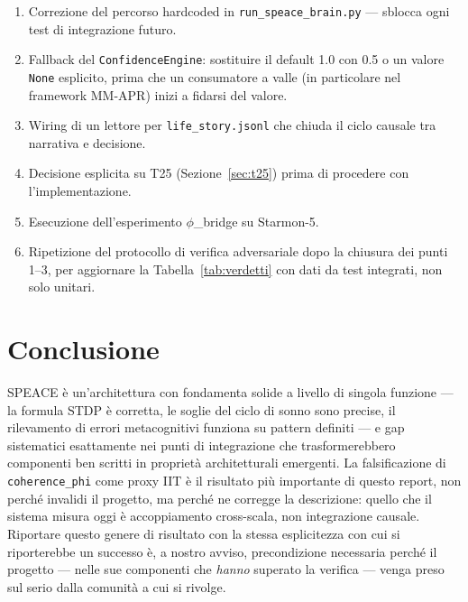 \documentclass[11pt,a4paper]{article}
\newcommand{\code}[1]{\texttt{#1}}
\newcommand{\coherencephi}{\code{coherence\_phi}}
\newcommand{\starmon}{Starmon-5\xspace}
\begin{document}
\begin{enumerate}
  \item Correzione del percorso hardcoded in \code{run\_speace\_brain.py} --- sblocca ogni test di integrazione futuro.
  \item Fallback del \code{ConfidenceEngine}: sostituire il default 1.0 con 0.5 o un valore \code{None} esplicito, prima che un consumatore a valle (in particolare nel framework MM-APR) inizi a fidarsi del valore.
  \item Wiring di un lettore per \code{life\_story.jsonl} che chiuda il ciclo causale tra narrativa e decisione.
  \item Decisione esplicita su T25 (Sezione~\ref{sec:t25}) prima di procedere con l'implementazione.
  \item Esecuzione dell'esperimento $\phi$\_bridge su \starmon.
  \item Ripetizione del protocollo di verifica adversariale dopo la chiusura dei punti 1--3, per aggiornare la Tabella~\ref{tab:verdetti} con dati da test integrati, non solo unitari.
\end{enumerate}

\section{Conclusione}
\label{sec:conclusion}

SPEACE \`e un'architettura con fondamenta solide a livello di singola funzione --- la formula STDP \`e corretta, le soglie del ciclo di sonno sono precise, il rilevamento di errori metacognitivi funziona su pattern definiti --- e gap sistematici esattamente nei punti di integrazione che trasformerebbero componenti ben scritti in propriet\`a architetturali emergenti. La falsificazione di \coherencephi{} come proxy IIT \`e il risultato pi\`u importante di questo report, non perch\'e invalidi il progetto, ma perch\'e ne corregge la descrizione: quello che il sistema misura oggi \`e accoppiamento cross-scala, non integrazione causale. Riportare questo genere di risultato con la stessa esplicitezza con cui si riporterebbe un successo \`e, a nostro avviso, precondizione necessaria perch\'e il progetto --- nelle sue componenti che \emph{hanno} superato la verifica --- venga preso sul serio dalla comunit\`a a cui si rivolge.
\end{document}
